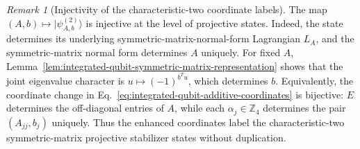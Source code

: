 \documentclass[11pt]{article}
\newcommand{\1}{\mathbf 1}
\theoremstyle{plain}
\theoremstyle{definition}
\theoremstyle{remark}
\newtheorem{remark}[theorem]{Remark}
\begin{document}
\begin{remark}[Injectivity of the characteristic-two coordinate labels]
\label{rem:qubit-state-label-injectivity}
The map $(A,b)\mapsto|\psi_{A,b}^{(2)}\rangle$ is injective at the level of
projective states.  Indeed, the state determines its underlying symmetric-matrix-normal-form
Lagrangian $L_A$, and the symmetric-matrix normal form determines $A$
uniquely.  For fixed $A$, Lemma~\ref{lem:integrated-qubit-symmetric-matrix-representation}
shows that the joint eigenvalue character is
$u\mapsto(-1)^{b^Tu}$, which determines $b$.  Equivalently, the coordinate
change in Eq.~\eqref{eq:integrated-qubit-additive-coordinates} is bijective:
$E$ determines the off-diagonal entries of $A$, while each
$\alpha_j\in\mathbb Z_4$ determines the pair $(A_{jj},b_j)$ uniquely.
Thus the enhanced coordinates label the characteristic-two symmetric-matrix
projective stabilizer states without duplication.
\end{remark}
\end{document}
